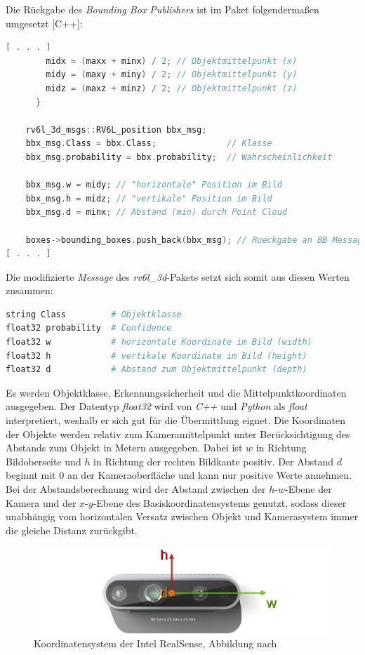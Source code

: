 \newpage
Die Rückgabe des \textit{Bounding Box Publishers} ist im Paket folgendermaßen umgesetzt  [C++]:

\begin{lstlisting}[language=c++]
[ . . . ]
        midx = (maxx + minx) / 2; // Objektmittelpunkt (x)
        midy = (maxy + miny) / 2; // Objektmittelpunkt (y)
        midz = (maxz + minz) / 2; // Objektmittelpunkt (z)
      }
    
    rv6l_3d_msgs::RV6L_position bbx_msg;
    bbx_msg.Class = bbx.Class;              // Klasse
    bbx_msg.probability = bbx.probability;  // Wahrscheinlichkeit

    bbx_msg.w = midy; // "horizontale" Position im Bild
    bbx_msg.h = midz; // "vertikale" Position im Bild
    bbx_msg.d = minx; // Abstand (min) durch Point Cloud

    boxes->bounding_boxes.push_back(bbx_msg); // Rueckgabe an BB Message
[ . . . ]
\end{lstlisting}

Die modifizierte \textit{Message} des \textit{rv6l\_3d}-Pakets setzt sich somit aus diesen Werten zusammen:

\begin{lstlisting}[language=python]
string Class         # Objektklasse
float32 probability  # Confidence
float32 w            # horizontale Koordinate im Bild (width)
float32 h            # vertikale Koordinate im Bild (height)
float32 d            # Abstand zum Objektmittelpunkt (depth)
\end{lstlisting}

Es werden Objektklasse, Erkennungssicherheit und die Mittelpunktkoordinaten ausgegeben. Der Datentyp \textit{float32} wird von \textit{C++} und \textit{Python} als \textit{float} interpretiert, weshalb er sich gut für die Übermittlung eignet. Die Koordinaten der Objekte werden relativ zum Kameramittelpunkt unter Berücksichtigung des Abstands zum Objekt in Metern ausgegeben. Dabei ist $w$ in Richtung Bildoberseite und $h$ in Richtung der rechten Bildkante positiv. Der Abstand $d$ beginnt mit $0$ an der Kameraoberfläche und kann nur positive Werte annehmen.
Bei der Abstandsberechnung wird der Abstand zwischen der $h$-$w$-Ebene der Kamera  und der $x$-$y$-Ebene des Basiskoordinatensystems genutzt, sodass dieser unabhängig vom horizontalen Versatz zwischen Objekt und Kamerasystem immer die gleiche Distanz zurückgibt.

\begin{figure}[ht]
    \centering
    \includegraphics[width=\textwidth]{Bilder/realsense_koord.jpg}
    \caption{Koordinatensystem der Intel RealSense, Abbildung nach \cite{intel_corporation_depth_2022}}
    \label{fig:realsense_koord}
\end{figure}

